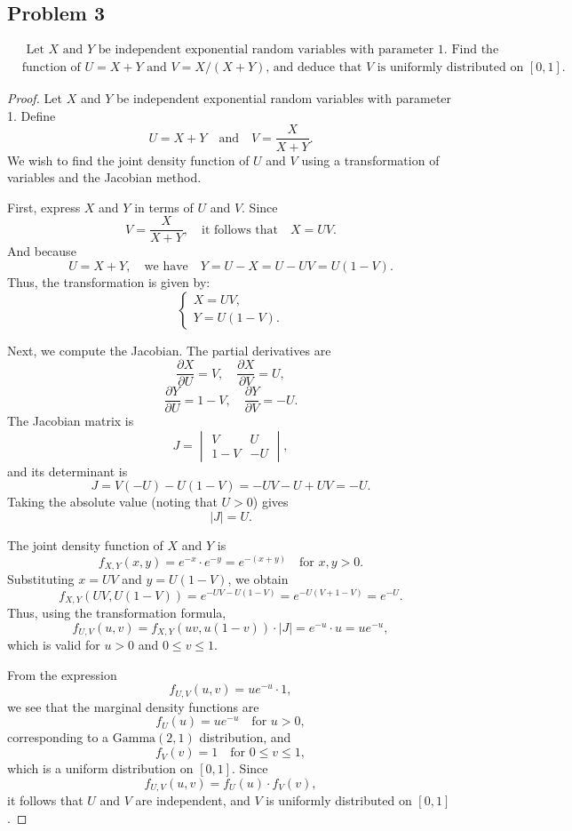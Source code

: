 \documentclass[letterpaper, 11pt]{article}
\newcommand{\1}{\mathds{1}}	%
\theoremstyle{definition}
\begin{document}
\subsection*{Problem 3}
\begin{align*}
    & \text{ Let $X$ and $Y$ be independent exponential random variables with parameter 1. Find the joint density} \\
    & \text{function of $U = X + Y$ and $V = X/(X + Y)$, and deduce that $V$ is uniformly distributed on $[0, 1]$.}
\end{align*}
\begin{proof}

Let \(X\) and \(Y\) be independent exponential random variables with parameter 1. Define
\[
U = X + Y \quad \text{and} \quad V = \frac{X}{X+Y}.
\]
We wish to find the joint density function of \(U\) and \(V\) using a transformation of variables and the Jacobian method.

First, express \(X\) and \(Y\) in terms of \(U\) and \(V\). Since
\[
V = \frac{X}{X+Y}, \quad \text{it follows that} \quad X = U V.
\]
And because
\[
U = X + Y, \quad \text{we have} \quad Y = U - X = U - U V = U(1-V).
\]
Thus, the transformation is given by:
\[
\begin{cases}
X = UV, \\
Y = U(1-V).
\end{cases}
\]

Next, we compute the Jacobian. The partial derivatives are
\[
\frac{\partial X}{\partial U} = V, \quad \frac{\partial X}{\partial V} = U,
\]
\[
\frac{\partial Y}{\partial U} = 1-V, \quad \frac{\partial Y}{\partial V} = -U.
\]
The Jacobian matrix is
\[
J = \begin{vmatrix} 
V & U \\
1-V & -U
\end{vmatrix},
\]
and its determinant is
\[
J = V(-U) - U(1-V) = -UV - U + UV = -U.
\]
Taking the absolute value (noting that \(U > 0\)) gives
\[
|J| = U.
\]

The joint density function of \(X\) and \(Y\) is
\[
f_{X,Y}(x,y) = e^{-x} \cdot e^{-y} = e^{-(x+y)} \quad \text{for } x,y > 0.
\]
Substituting \(x = UV\) and \(y = U(1-V)\), we obtain
\[
f_{X,Y}(UV, U(1-V)) = e^{-UV-U(1-V)} = e^{-U(V+1-V)} = e^{-U}.
\]
Thus, using the transformation formula,
\[
f_{U,V}(u,v) = f_{X,Y}(uv, u(1-v)) \cdot |J| = e^{-u} \cdot u = u e^{-u},
\]
which is valid for \(u > 0\) and \(0 \leq v \leq 1\).

From the expression
\[
f_{U,V}(u,v) = u e^{-u} \cdot 1,
\]
we see that the marginal density functions are
\[
f_U(u) = u e^{-u} \quad \text{for } u > 0,
\]
corresponding to a \(\text{Gamma}(2,1)\) distribution, and
\[
f_V(v) = 1 \quad \text{for } 0 \leq v \leq 1,
\]
which is a uniform distribution on \([0,1]\). Since
\[
f_{U,V}(u,v) = f_U(u) \cdot f_V(v),
\]
it follows that \(U\) and \(V\) are independent, and \(V\) is uniformly distributed on \([0,1]\).
    
\end{proof}
\end{document}
